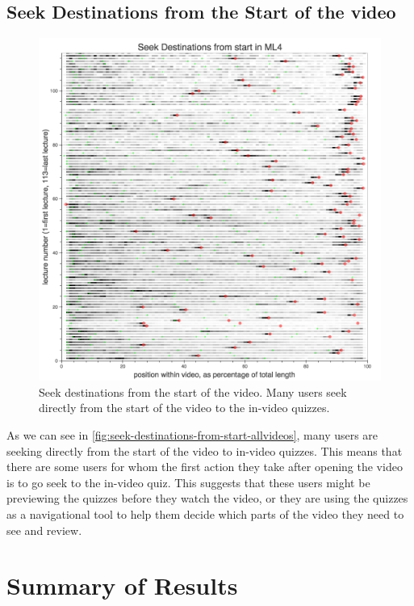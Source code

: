 \documentclass{sigchi}
\begin{document}
\subsection{Seek Destinations from the Start of the video}

\begin{figure}
\includegraphics[width=1.0\columnwidth]{seek-destinations-from-start-allvideos}
\caption{Seek destinations from the start of the video. Many users seek directly from the start of the video to the in-video quizzes.}
\label{fig:seek-destinations-from-start-allvideos}
\end{figure}

As we can see in \autoref{fig:seek-destinations-from-start-allvideos}, many users are seeking directly from the start of the video to in-video quizzes. This means that there are some users for whom the first action they take after opening the video is to go seek to the in-video quiz. This suggests that these users might be previewing the quizzes before they watch the video, or they are using the quizzes as a navigational tool to help them decide which parts of the video they need to see and review.

\section{Summary of Results}
\end{document}
